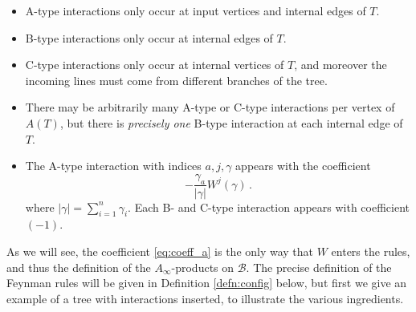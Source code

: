 \documentclass[english,letter paper,12pt,leqno]{article}
\theoremstyle{example}
\numberwithin{equation}{section}
\def\be{\begin{equation}}
\def\ee{\end{equation}}
\begin{document}
\begin{itemize}
\item A-type interactions only occur at input vertices and internal edges of $T$. 
\item B-type interactions only occur at internal edges of $T$.
\item C-type interactions only occur at internal vertices of $T$, and moreover the incoming lines must come from different branches of the tree.
\item There may be arbitrarily many A-type or C-type interactions per vertex of $A(T)$, but there is \emph{precisely one} B-type interaction at each internal edge of $T$.
\item The A-type interaction with indices $a,j, \gamma$ appears with the coefficient
\be\label{eq:coeff_a}
-\frac{\gamma_a}{|\gamma|} W^j( \gamma)\,.
\ee
where $|\gamma| = \sum_{i=1}^n \gamma_i$. Each B- and C-type interaction appears with coefficient $(-1)$.
\end{itemize}

As we will see, the coefficient \eqref{eq:coeff_a} is the only way that $W$ enters the rules, and thus the definition of the $A_\infty$-products on $\mathscr{B}$. The precise definition of the Feynman rules will be given in Definition \ref{defn:config} below, but first we give an example of a tree with interactions inserted, to illustrate the various ingredients.
\end{document}
